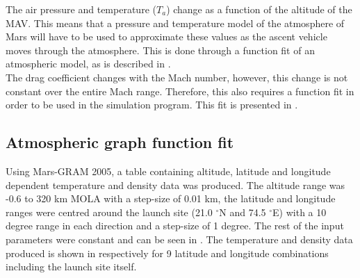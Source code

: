 The air pressure and temperature ($T_{{a}}$) change as a function of the altitude of the \ac{MAV}. This means that a pressure and temperature model of the atmosphere of Mars will have to be used to approximate these values as the ascent vehicle moves through the atmosphere. This is done through a function fit of an atmospheric model, as is described in .\\

The drag coefficient changes with the Mach number, however, this change is not constant over the entire Mach range. Therefore, this also requires a function fit in order to be used in the simulation program. This fit is presented in .

\subsection{Atmospheric graph function fit}
\label{subsec:atmofuncfit}
Using Mars-\ac{GRAM} 2005, a table containing altitude, latitude and longitude dependent temperature and density data was produced. The altitude range was -0.6 to 320 km \ac{MOLA} with a step-size of 0.01 km, the latitude and longitude ranges were centred around the launch site (21.0 $^\circ$N and 74.5 $^\circ$E) with a 10 degree range in each direction and a step-size of 1 degree. The rest of the input parameters were constant and can be seen in . The temperature and density data produced is shown in  respectively for 9 latitude and longitude combinations including the launch site itself.                                                                                                                                                                                                                                                                                                                                                                                                                                                                                          



